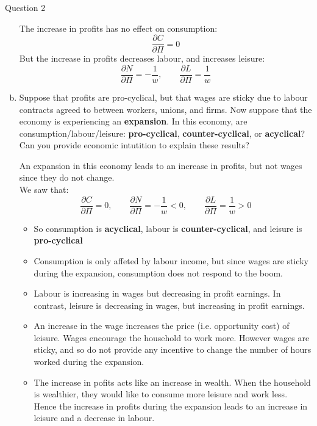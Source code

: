 \documentclass[a4paper]{article}
\newif\IfInSansMode
\begin{document}
\begin{questionbox}{Question 2}
\begin{enumerate}[(a)]
			\begin{explanationbox}
				The increase in profits has no effect on consumption:
				\[
					\frac{\partial C}{\partial \Pi} = 0
				\]
				But the increase in profits decreases labour, and increases leisure:
				\[
					\frac{\partial N}{\partial \Pi}= -\frac{1}{w}, \qquad \frac{\partial L}{\partial \Pi} = \frac{1}{w}
				\]
			\end{explanationbox}
			\item Suppose that profits are pro-cyclical, but that wages are sticky due to labour contracts agreed to between workers, unions, and firms. Now suppose that the economy is experiencing an \textbf{expansion}. In this economy, are consumption/labour/leisure: \textbf{pro-cyclical}, \textbf{counter-cyclical}, or \textbf{acyclical}? Can you provide economic intutition to explain these results?
			\begin{explanationbox}
				An expansion in this economy leads to an increase in profits, but not wages since they do not change.\\
				We saw that:
				\[
					\frac{\partial C}{\partial \Pi} = 0, \qquad \frac{\partial N}{\partial \Pi}= -\frac{1}{w} <0, \qquad \frac{\partial L}{\partial \Pi} = \frac{1}{w}>0
				\]
				\begin{itemize}
					\item So consumption is \textbf{acyclical}, labour is \textbf{counter-cyclical}, and leisure is \textbf{pro-cyclical}
					\item Consumption is only affeted by labour income, but since wages are sticky during the expansion, consumption does not respond to the boom.
				\end{itemize}
			\end{explanationbox}
			\begin{explanationbox}
				\begin{itemize}
					\item Labour is increasing in wages but decreasing in profit earnings. In contrast, leisure is decreasing in wages, but increasing in profit earnings.
					\item An increase in the wage increases the price (i.e. opportunity cost) of leisure. Wages encourage the household to work more. However wages are sticky, and so do not provide any incentive to change the number of hours worked during the expansion.
					\item The increase in pofits acts like an increase in wealth. When the household is wealthier, they would like to consume more leisure and work less. Hence the increase in profits during the expansion leads to an increase in leisure and a decrease in labour.
				\end{itemize}
			\end{explanationbox}
		\end{enumerate}
	\end{questionbox}
\end{document}
